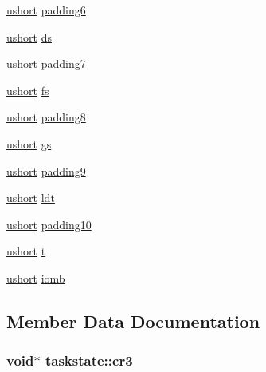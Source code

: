 \begin{DoxyCompactItemize}
\item 
\hyperlink{types_8h_ab95f123a6c9bcfee6a343170ef8c5f69}{ushort} \hyperlink{structtaskstate_a3885094380c4d991fa86d31fdf1b9683}{padding6}
\item 
\hyperlink{types_8h_ab95f123a6c9bcfee6a343170ef8c5f69}{ushort} \hyperlink{structtaskstate_af5f19782df3eb439445274e08d9120f1}{ds}
\item 
\hyperlink{types_8h_ab95f123a6c9bcfee6a343170ef8c5f69}{ushort} \hyperlink{structtaskstate_a4c634b4b3cd489ca37979561394bf518}{padding7}
\item 
\hyperlink{types_8h_ab95f123a6c9bcfee6a343170ef8c5f69}{ushort} \hyperlink{structtaskstate_a4ce0e6f25b9721d7e2660c8840a0f9e3}{fs}
\item 
\hyperlink{types_8h_ab95f123a6c9bcfee6a343170ef8c5f69}{ushort} \hyperlink{structtaskstate_ab3077e8c9fe9b50ff7caedeeac075472}{padding8}
\item 
\hyperlink{types_8h_ab95f123a6c9bcfee6a343170ef8c5f69}{ushort} \hyperlink{structtaskstate_a15529ac51461a168be78130042a740e7}{gs}
\item 
\hyperlink{types_8h_ab95f123a6c9bcfee6a343170ef8c5f69}{ushort} \hyperlink{structtaskstate_a58a780ba0664e4ff8741adbdaccbcdd5}{padding9}
\item 
\hyperlink{types_8h_ab95f123a6c9bcfee6a343170ef8c5f69}{ushort} \hyperlink{structtaskstate_a960e5d4a40dcafb35f32ec047c0ca147}{ldt}
\item 
\hyperlink{types_8h_ab95f123a6c9bcfee6a343170ef8c5f69}{ushort} \hyperlink{structtaskstate_a6f95dd6d0ae39afaaf5ee8671220b00b}{padding10}
\item 
\hyperlink{types_8h_ab95f123a6c9bcfee6a343170ef8c5f69}{ushort} \hyperlink{structtaskstate_ad9d64e6139f851a3f8d2275f2748fae5}{t}
\item 
\hyperlink{types_8h_ab95f123a6c9bcfee6a343170ef8c5f69}{ushort} \hyperlink{structtaskstate_a5ee57b190324239a5d88f7c02039901f}{iomb}
\end{DoxyCompactItemize}


\subsection{Member Data Documentation}
\subsubsection[{\texorpdfstring{cr3}{cr3}}]{\setlength{\rightskip}{0pt plus 5cm}void$\ast$ taskstate\+::cr3}\hypertarget{structtaskstate_ac891b558913b4528fd2c9351c99da201}{}\label{structtaskstate_ac891b558913b4528fd2c9351c99da201}
